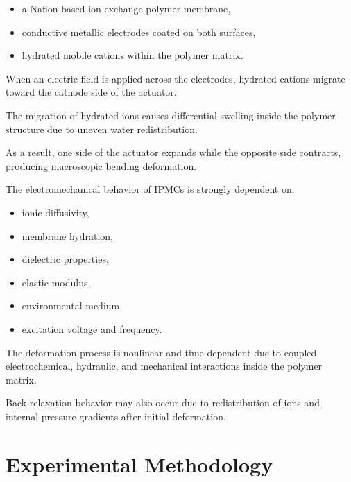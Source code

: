 \documentclass[11pt,a4paper]{article}
\begin{document}
\begin{itemize}

\item a Nafion-based ion-exchange polymer membrane,

\item conductive metallic electrodes coated on both surfaces,

\item hydrated mobile cations within the polymer matrix.

\end{itemize}

When an electric field is applied across the electrodes, hydrated cations migrate toward the cathode side of the actuator.

The migration of hydrated ions causes differential swelling inside the polymer structure due to uneven water redistribution.

As a result, one side of the actuator expands while the opposite side contracts, producing macroscopic bending deformation.

The electromechanical behavior of IPMCs is strongly dependent on:

\begin{itemize}

\item ionic diffusivity,

\item membrane hydration,

\item dielectric properties,

\item elastic modulus,

\item environmental medium,

\item excitation voltage and frequency.

\end{itemize}

The deformation process is nonlinear and time-dependent due to coupled electrochemical, hydraulic, and mechanical interactions inside the polymer matrix.

Back-relaxation behavior may also occur due to redistribution of ions and internal pressure gradients after initial deformation.


\section{Experimental Methodology}
\end{document}
